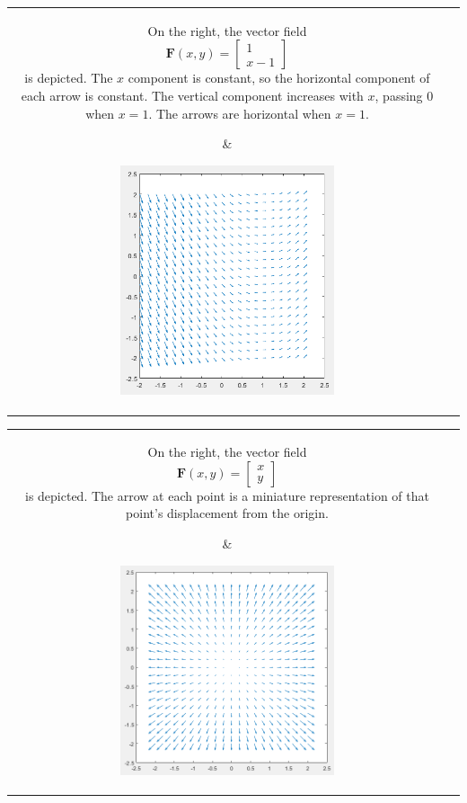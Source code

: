 \documentclass{article}
\begin{document}
\begin{tabular}{cc}
\parbox{0.5\textwidth}{
On the right, the vector field
\[\mathbf{F}(x,y) = \begin{bmatrix} 1 \\ x - 1 \end{bmatrix}\]
is depicted. The \(x\) component is constant, so the horizontal component of each arrow is constant. The vertical component increases with \(x\), passing \(0\) when \(x = 1\). The arrows are horizontal when \(x = 1\).
} & \parbox{0.5\textwidth}{
\includegraphics[width = 0.5\textwidth]{example_vector_field_2}
}
\end{tabular}

\begin{tabular}{cc}
\parbox{0.5\textwidth}{
On the right, the vector field
\[\mathbf{F}(x,y) = \begin{bmatrix} x \\ y \end{bmatrix}\]
is depicted. The arrow at each point is a miniature representation of that point's displacement from the origin.  
} & \parbox{0.5\textwidth}{
\includegraphics[width = 0.5\textwidth]{example_vector_field_3}
}
\end{tabular}
\end{document}
